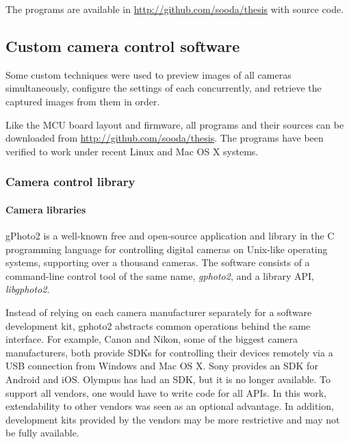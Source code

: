 The programs are available in \url {http://github.com/sooda/thesis} with source code.


\subsection{Custom camera control software} %



Some custom techniques were used to preview images of all cameras simultaneously, configure the settings of each concurrently, and retrieve the captured images from them in order.

Like the MCU board layout and firmware, all programs and their sources can be downloaded from \url {http://github.com/sooda/thesis}.
The programs have been verified to work under recent Linux and Mac OS X systems.


\subsubsection{Camera control library} %

\paragraph{Camera libraries}
gPhoto2 \cite{gphoto2} is a well-known free and open-source application and library in the C programming language for controlling digital cameras on Unix-like operating systems, supporting over a thousand cameras.
The software consists of a command-line control tool of the same name, \emph{gphoto2}, and a library API, \emph{libgphoto2}.

Instead of relying on each camera manufacturer separately for a software development kit, gphoto2 abstracts common operations behind the same interface.
For example, Canon and Nikon, some of the biggest camera manufacturers, both provide SDKs for controlling their devices remotely via a USB connection from Windows and Mac OS X. \cite{canonedsdk} \cite{nikonsdk}
Sony provides an SDK for Android and iOS. \cite{sonysdk}
Olympus has had an SDK, but it is no longer available. \cite{olympussdk}
To support all vendors, one would have to write code for all APIs.
In this work, extendability to other vendors was seen as an optional advantage.
In addition, development kits provided by the vendors may be more restrictive and may not be fully available.

